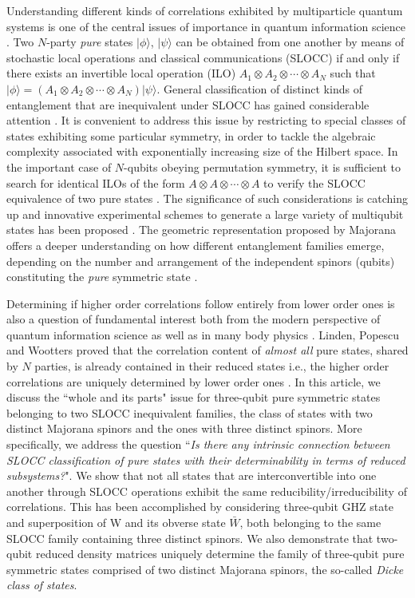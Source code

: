 Understanding different kinds of correlations exhibited by multiparticle quantum systems is one of the  central issues of importance in quantum information science \cite{Niel}. Two $N$-party {\em pure} states $\vert\phi\rangle$, $\vert \psi\rangle$  can be obtained from one another by means of stochastic local operations and classical communications (SLOCC)  if and only if there exists an invertible local operation (ILO) \cite{Dur} $A_1\otimes A_2\otimes \cdots \otimes A_N$ such that $\vert \phi\rangle=\left(A_1\otimes A_2\otimes \cdots \otimes A_N\right)\vert\psi\rangle$. General classification of distinct kinds of entanglement that are inequivalent under SLOCC has gained considerable attention \cite{Dur,Ver,Lamata}. It is convenient to address this issue by restricting to special classes of states exhibiting some particular symmetry, in order to tackle the algebraic complexity associated with exponentially increasing size of the Hilbert space. In the important case of  $N$-qubits obeying permutation symmetry, it is sufficient to search for identical ILOs of the form $A\otimes A\otimes\cdots \otimes A$ to verify the SLOCC equivalence of two pure states \cite{solano,bastin}. The significance of such considerations is catching up and  innovative experimental schemes to generate a large variety of multiqubit states has been proposed \cite{newexpt1,newexpt2}. The geometric representation proposed by Majorana \cite{majorana} offers a deeper understanding on how different entanglement families emerge, depending on the number and arrangement of the independent spinors (qubits) constituting the {\em pure} symmetric state \cite{solano}. 

Determining if higher order correlations follow entirely from lower order ones is also a question of fundamental interest both from the modern perspective of quantum information science \cite{SP1,SP2,SP2b} as well as in many body physics \cite{Coleman}. Linden, Popescu and Wootters \cite{SP1,SP2,SP2b} proved that the correlation content of {\em almost all} pure states, shared by $N$ parties, is already contained in their reduced states i.e., the higher order correlations are uniquely determined by lower order ones \cite{SP1,SP2,SP2b}. In this article, we discuss the ``whole and its parts" issue for three-qubit pure symmetric states belonging to two SLOCC inequivalent families, the class of states with two distinct Majorana spinors and the ones with three distinct spinors. More specifically, we address the question ``{\em Is there any intrinsic connection between SLOCC classification of pure states with their determinability in terms of reduced subsystems?}". We show that not all states that are interconvertible into one another through SLOCC operations exhibit the same reducibility/irreducibility of correlations. This has been accomplished by considering three-qubit GHZ state and superposition of W and its obverse state $\bar{W}$, both belonging to the same SLOCC family containing three distinct spinors.   We also demonstrate that two-qubit reduced density matrices uniquely determine the family of three-qubit  pure symmetric states comprised of two distinct Majorana spinors, the so-called {\emph {Dicke class of states}}.

